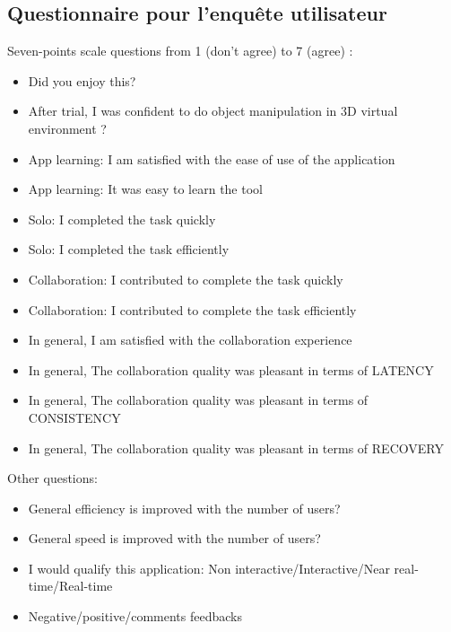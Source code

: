 \subsection{Questionnaire pour l'enquête utilisateur}
\label{q:xp2}
Seven-points scale questions from 1 (don't agree) to 7 (agree) :
\begin{itemize}
	\item Did you enjoy this?
	\item After trial, I was confident to do object manipulation in 3D virtual 
	environment ?
	\item App learning: I am satisfied with the ease of use of the application
	\item App learning: It was easy to learn the tool
	\item Solo: I completed the task quickly
	\item Solo: I completed the task efficiently
	\item Collaboration: I contributed to complete the task quickly
	\item Collaboration: I contributed to complete the task efficiently
	\item In general, I am satisfied with the collaboration experience
	\item In general, The collaboration quality was pleasant in terms of LATENCY
	\item In general, The collaboration quality was pleasant in terms of 
	CONSISTENCY
	\item In general, The collaboration quality was pleasant in terms of RECOVERY
\end{itemize}
Other questions:
\begin{itemize}
	\item General efficiency is improved with the number of users?
	\item General speed is improved with the number of users?
	\item I would qualify this application: Non interactive/Interactive/Near 
	real-time/Real-time
	\item Negative/positive/comments feedbacks
\end{itemize}

